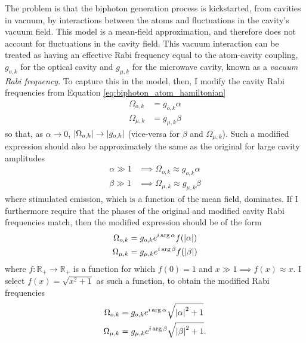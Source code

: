 The problem is that the biphoton generation process is kickstarted, from cavities in vacuum, by interactions between the atoms and fluctuations in the cavity's vacuum field. This model is a mean-field approximation, and therefore does not account for fluctuations in the cavity field. This vacuum interaction can be treated as having an effective Rabi frequency equal to the atom-cavity coupling, $g_{o,k}$ for the optical cavity and $g_{\mu,k}$ for the microwave cavity, known as a \textit{vacuum Rabi frequency}\cite{gerry_knight_book}. To capture this in the model, then, I modify the cavity Rabi frequencies from Equation \ref{eq:biphoton_atom_hamiltonian}
\begin{align}
    \Omega_{o,k} &= g_{o,k}\alpha\\
    \Omega_{\mu,k} &= g_{\mu,k}\beta
\end{align}
so that, as $\alpha \to 0$, $\left|\Omega_{o,k}\right| \to \left|g_{o,k}\right|$ (vice-versa for $\beta$ and $\Omega_{\mu,k}$). Such a modified expression should also be approximately the same as the original for large cavity amplitudes
\begin{align}
    \alpha \gg 1 &\implies \Omega_{o,k} \approx g_{o,k}\alpha\\
    \beta \gg 1 &\implies \Omega_{\mu,k} \approx g_{\mu,k}\beta
\end{align}
where stimulated emission, which is a function of the mean field, dominates. If I furthermore require that the phases of the original and modified cavity Rabi frequencies match, then the modified expression should be of the form
\begin{align}
    \Omega_{o,k} &= g_{o,k}e^{i\arg\alpha} f(\left|\alpha\right|)\\
    \Omega_{\mu,k} &= g_{\mu,k}e^{i\arg\beta} f(\left|\beta\right|)
\end{align}
where $f: \mathbb{R}_+ \to \mathbb{R}_+$ is a function for which $f(0)=1$ and $x\gg 1 \implies f(x)\approx x$. I select $f(x) = \sqrt{x^2+1}$ as such a function, to obtain the modified Rabi frequencies
\begin{align}
    \Omega_{o,k} &= g_{o,k}e^{i\arg\alpha} \sqrt{\left|\alpha\right|^2+1}\\
    \Omega_{\mu,k} &= g_{\mu,k}e^{i\arg\beta} \sqrt{\left|\beta\right|^2+1}.
\end{align}

